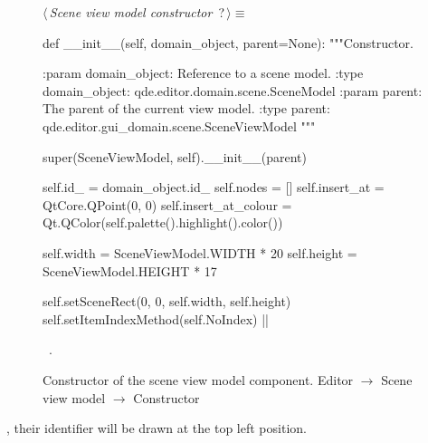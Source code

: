 \documentclass[%
    a4paper,    %
    justified,  %
    nobib,      %
    openany     %
]{tufte-book}
\begin{document}
\begin{figure}
\begin{flushleft} \small
\begin{minipage}{\linewidth}\label{scrap90}\raggedright\small
{} $\langle\,${\itshape Scene view model constructor}\nobreak\ {\footnotesize {?}}$\,\rangle\equiv$
\vspace{-1ex}
\begin{pythoncode}
def __init__(self, domain_object, parent=None):
   """Constructor.

   :param domain_object: Reference to a scene model.
   :type  domain_object: qde.editor.domain.scene.SceneModel
   :param parent:        The parent of the current view model.
   :type parent:         qde.editor.gui_domain.scene.SceneViewModel
   """

   super(SceneViewModel, self).__init__(parent)

   self.id_              = domain_object.id_
   self.nodes            = []
   self.insert_at        = QtCore.QPoint(0, 0)
   self.insert_at_colour = Qt.QColor(self.palette().highlight().color())

   self.width            = SceneViewModel.WIDTH * 20
   self.height           = SceneViewModel.HEIGHT * 17

   self.setSceneRect(0, 0, self.width, self.height)
   self.setItemIndexMethod(self.NoIndex)
|\NWsep|
\end{pythoncode}
\vspace{1.5ex}
\footnotesize
\begin{list}{}{\setlength{\itemsep}{-\parsep}\setlength{\itemindent}{-\leftmargin}}
\item \NWtxtMacroRefIn\ .

\item{}
\end{list}
\end{minipage}\vspace{4ex}
\end{flushleft}
\caption{Constructor of the scene view model component.
  \newline{}\newline{}Editor $\rightarrow$ Scene view model $\rightarrow$
  Constructor}
\label{editor:lst:scene-view-model:constructor}
\end{figure}

, their identifier
will be drawn at the top left position.
\end{document}
